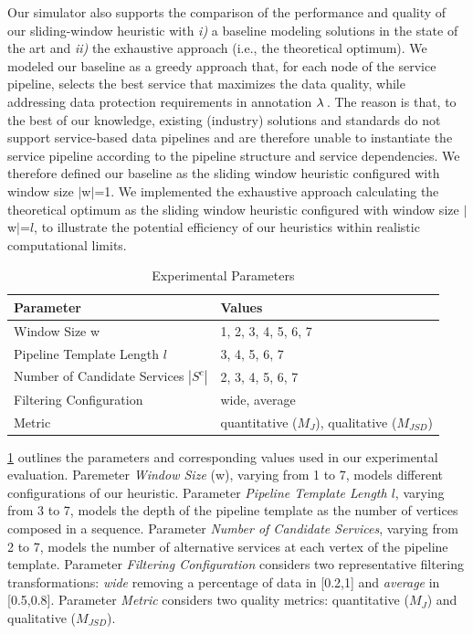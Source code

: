     Our simulator also supports the comparison of the performance and quality of our sliding-window heuristic with \emph{i)} a baseline modeling solutions in the state of the art and \emph{ii)} the exhaustive approach (i.e., the theoretical optimum). We modeled our baseline as a greedy approach that, for each node of the service pipeline, selects the best service that maximizes the data quality, while addressing data protection requirements in annotation $\lambda\,$. The reason is that, to the best of our knowledge, existing (industry) solutions and standards do not support service-based data pipelines and are therefore unable to instantiate the service pipeline according to the pipeline structure and service dependencies. We therefore defined our baseline as the sliding window heuristic configured with window size $|$w$|$=1.
    We implemented the exhaustive approach calculating the theoretical optimum as the sliding window heuristic configured with window size $|$w$|$=$l$, to illustrate the potential efficiency of our heuristics within realistic computational limits.

    \begin{table}[!t]
      \caption{Experimental Parameters}
      \label{tab:parameters}
      \centering
      {\color{OurColor2}
      \begin{tabular}{l|l}
        \textbf{Parameter}                  & \textbf{Values}  \\
        \hline
        Window Size \textbar{}w\textbar{} & 1, 2, 3, 4, 5, 6, 7 \\
        Pipeline Template Length $l$        & 3, 4, 5, 6, 7 \\
        Number of Candidate Services $|S^c|$ & 2, 3, 4, 5, 6, 7 \\
        Filtering Configuration             & wide, average    \\
        Metric                             & quantitative ($M_J$), qualitative ($M_{JSD}$) \\
      \end{tabular}
      }
    \end{table}
    {\color{OurColor2}
    \cref{tab:parameters} outlines the parameters and corresponding values used in our experimental evaluation. Paremeter \emph{Window Size} (\textbar{}w\textbar{}), varying from 1 to 7, models different configurations of our heuristic. Parameter \emph{Pipeline Template Length $l$}, varying from 3 to 7, models the depth of the pipeline template as the number of vertices composed in a sequence. Parameter \emph{Number of Candidate Services}, varying from 2 to 7, models the number of alternative services at each vertex of the pipeline template. Parameter \emph{Filtering Configuration} considers two representative filtering transformations: \textit{wide} removing a percentage of data in [0.2,1] and \textit{average} in [0.5,0.8]. Parameter \emph{Metric} considers two quality metrics: quantitative ($M_J$) and qualitative ($M_{JSD}$).}


